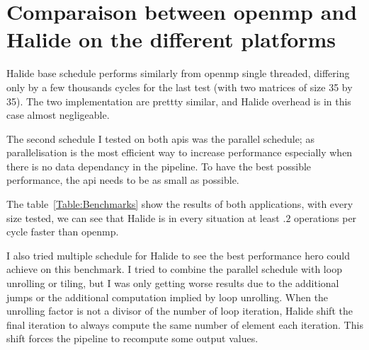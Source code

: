 \section{Comparaison between \acrshort{openmp} and Halide on the different platforms}



	Halide base schedule performs similarly from \gls{openmp} single threaded, differing only by a few thousands cycles for the last test (with two matrices of size 35 by 35).
	The two implementation are prettty similar, and Halide overhead is in this case almost negligeable.

	The second schedule I tested on both \glspl{api} was the parallel schedule; as parallelisation is the most efficient way to increase performance especially when there is no data dependancy in the pipeline. To have the best possible performance, the \gls{api} needs to be as small as possible.

	The table~\ref{Table:Benchmarks} show the results of both applications, with every size tested, we can see that Halide is in every situation at least $.2$ operations per cycle faster than \gls{openmp}.




I also tried multiple schedule for Halide to see the best performance \gls{hero} could achieve on this benchmark. I tried to combine the parallel schedule with loop unrolling or tiling, but I was only getting worse results due to the additional jumps or the additional computation implied by loop unrolling. When the unrolling factor is not a divisor of the number of loop iteration, Halide shift the final iteration to always compute the same number of element each iteration. This shift forces the pipeline to recompute some output values.


